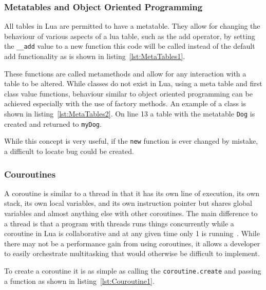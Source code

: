 \documentclass[11pt,a4paper,titlepage]{article}
\begin{document}
		\subsubsection{Metatables and Object Oriented Programming}
			All tables in Lua are permitted to have a metatable\cite{Ierusalimschy:2013:PLT:2502646}. They allow for changing the behaviour of various aspects of a lua table, such as the add operator, by setting the \texttt{\_\_add} value to a new function this code will be called instead of the default add functionality as is shown in listing~\ref{lst:MetaTables1}.
			

			These functions are called metamethods and allow for any interaction with a table to be altered. While classes do not exist in Lua, using a meta table and first class value functions, behaviour similar to object oriented programming can be achieved especially with the use of factory methods. An example of a class is shown in listing~\ref{lst:MetaTables2}. On line 13 a table with the metatable \texttt{Dog} is created and returned to \texttt{myDog}.
			

			While this concept is very useful, if the \texttt{new} function is ever changed by mistake, a difficult to locate bug could be created.

		\subsubsection{Couroutines}
			A coroutine is similar to a thread in that it has its own line of execution, its own stack, its own local variables, and its own instruction pointer but shares global variables and almost anything else with other coroutines. The main difference to a thread is that a program with threads runs things concurrently while a coroutine in Lua is collaborative and at any given time only 1 is running~\cite{Ierusalimschy:2013:PLT:2502646}. While there may not be a performance gain from using coroutines, it allows a developer to easily orchestrate multitasking that would otherwise be difficult to implement.

			To create a coroutine it is as simple as calling the \texttt{coroutine.create} and passing a function as shown in listing~\ref{lst:Couroutine1}.
			 
\end{document}
